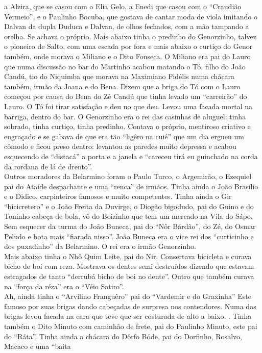 \documentclass[12pt,brazil,]{book}
\begin{document}
a Alzira, que se casou com o Elia Gelo, a Enedi que casou com o
``Craudião Vermeio'', e o Paulinho Bocuba, que gostava de cantar moda de
viola imitando o Dalvan da dupla Duduca e Dalvan, de olhos fechados, com
a mão tampando a orelha. Se achava o próprio. Mais abaixo tinha o
predinho do Genorzinho, talvez o pioneiro de Salto, com uma escada por
fora e mais abaixo o curtiço do Genor também, onde morava o Miliano e o
Dito Fonseca. O Miliano era pai do Lauro que numa discussão no bar do
Martinho acabou matando o Tó, filho do João Candú, tio do Niquimba que
morava na Maximiano Fidélis numa chácara também, irmão da Joana e do
Bena. Dizem que a briga do Tó com o Lauro começou por causa do Bena do
Zé Candú que tinha levado um ``carreirão'' do Lauro. O Tó foi tirar
satisfação e deu no que deu. Levou uma facada mortal na barriga, dentro
do bar. O Genorzinho era o rei das casinhas de aluguel: tinha sobrado,
tinha curtiço, tinha predinho. Contava o próprio, mentiroso criativo e
engraçado e se gabava de que era tão ``ligêro na cuié'' que um dia
ergueu um cômodo e ficou preso dentro: levantou as paredes muito
depressa e acabou esquecendo de ``distacá'' a porta e a janela e
``careceu tirá eu guinchado na corda da rordana de lá de drento''.\\
Outros moradores da Belarmino foram o Paulo Turco, o Argemirão, o
Ezequiel pai do Ataíde despachante e uma ``renca'' de irmãos. Tinha
ainda o João Brasílio e o Didico, carpinteiros famosos e muito
competentes. Tinha ainda o Gir ``bicicretero'' e o João Freita da
Duvirge, o Diogão bigodudo, pai do Guino e do Toninho cabeça de bola, vô
do Boizinho que tem um mercado na Vila do Sápo. Sem esquecer da turma do
João Buneca, pai do ``Nôr Bárdão'', do Zé, do Osmar Peludo e bota mais
``fiarada nisso''. João Buneca era o vice rei dos ``curticinho e dos
puxadinho'' da Belarmino. O rei era o irmão Genorzinho.\\
Mais abaixo tinha o Nhô Quim Leite, pai do Nir. Consertava bicicleta e
curava bicho de boi com reza. Mostrava os dentes semi destruídos dizendo
que estavam estragados de tanto ``derrubá bicho de boi no dente''. Outro
que também curava na ``força da réza'' era o ``Véio Satiro''.\\
Ah, ainda tinha o ``Arvilino Franguêro'' pai do ``Vardemir e do
Graxinha'' Este famoso por suas brigas dando cabeçadas de surpresa nos
contendores. Numa das brigas levou facada na cara que teve que ser
costurada de alto a baixo. . Tinha também o Dito Minuto com caminhão de
frete, pai do Paulinho Minuto, este pai do ``Ráta''. Tinha ainda a
chácara do Dôrfo Bóde, pai do Dorfinho, Rosalvo, Macaco e uma ``baita
\end{document}
